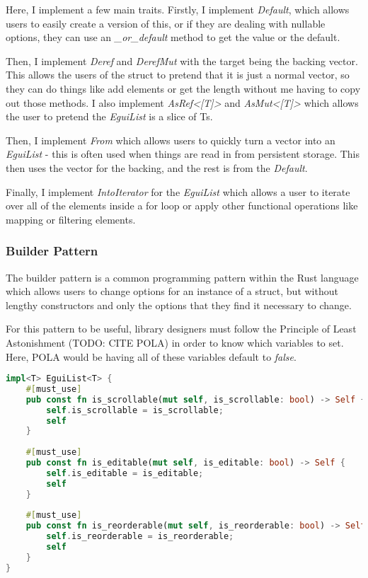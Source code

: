 \documentclass{article}
\begin{document}
Here, I implement a few main traits. Firstly, I implement \textit{Default}, which allows users to easily create a version of this, or if they are dealing with nullable options, they can use an \textit{\_or\_default} method to get the value or the default.

Then, I implement \textit{Deref} and \textit{DerefMut} with the target being the backing vector. This allows the users of the struct to pretend that it is just a normal vector, so they can do things like add elements or get the length without me having to copy out those methods. I also implement \textit{AsRef<[T]>} and \textit{AsMut<[T]>} which allows the user to pretend the \textit{EguiList} is a slice of Ts.

Then, I implement \textit{From} which allows users to quickly turn a vector into an \textit{EguiList} - this is often used when things are read in from persistent storage. This then uses the vector for the backing, and the rest is from the \textit{Default}. 

Finally, I implement \textit{IntoIterator} for the \textit{EguiList} which allows a user to iterate over all of the elements inside a for loop or apply other functional operations like mapping or filtering elements.

\subsubsection{Builder Pattern}
The builder pattern is a common programming pattern within the Rust language which allows users to change options for an instance of a struct, but without lengthy constructors and only the options that they find it necessary to change.

For this pattern to be useful, library designers must follow the Principle of Least Astonishment (TODO: CITE POLA) in order to know which variables to set. Here, POLA would be having all of these variables default to \textit{false}.

\begin{lstlisting}[language=Rust]
impl<T> EguiList<T> {
	#[must_use]
	pub const fn is_scrollable(mut self, is_scrollable: bool) -> Self {
		self.is_scrollable = is_scrollable;
		self
	}
	
	#[must_use]
	pub const fn is_editable(mut self, is_editable: bool) -> Self {
		self.is_editable = is_editable;
		self
	}
	
	#[must_use]
	pub const fn is_reorderable(mut self, is_reorderable: bool) -> Self {
		self.is_reorderable = is_reorderable;
		self
	}
}
\end{lstlisting}
\end{document}
